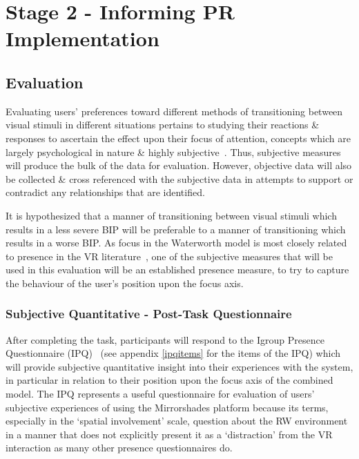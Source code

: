 \clearpage

\section{Stage 2 - Informing PR Implementation}

\subsection{Evaluation}

Evaluating users' preferences toward different methods of transitioning between visual stimuli in different situations pertains to studying their reactions \& responses to ascertain the effect upon their focus of attention, concepts which are largely psychological in nature \& highly subjective~\cite{Ijsselsteijn2001}. Thus, subjective measures will produce the bulk of the data for evaluation. However, objective data will also be collected \& cross referenced with the subjective data in attempts to support or contradict any relationships that are identified.

It is hypothesized that a manner of transitioning between visual stimuli which results in a less severe BIP will be preferable to a manner of transitioning which results in a worse BIP. As focus in the Waterworth model is most closely related to presence in the VR literature~\cite{Waterworth2001}, one of the subjective measures that will be used in this evaluation will be an established presence measure, to try to capture the behaviour of the user's position upon the focus axis.

\subsubsection{Subjective Quantitative - Post-Task Questionnaire}
After completing the task, participants will respond to the Igroup Presence Questionnaire (IPQ)~\cite{Schubert2001} (see appendix \ref{ipqitems} for the items of the IPQ) which will provide subjective quantitative insight into their experiences with the system, in particular in relation to their position upon the focus axis of the combined model. The IPQ represents a useful questionnaire for evaluation of users' subjective experiences of using the Mirrorshades platform because its terms, especially in the `spatial involvement' scale, question about the RW environment in a manner that does not explicitly present it as a `distraction' from the VR interaction as many other presence questionnaires do.

